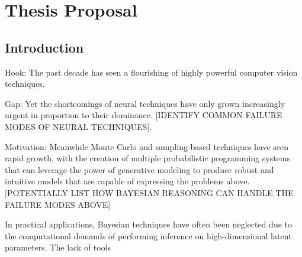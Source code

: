
\chapter{Thesis Proposal}

\section{Introduction}

Hook: The past decade has seen a flourishing of highly powerful computer vision techniques.

Gap: Yet the shortcomings of neural techniques have only grown increasingly urgent
in proportion to their dominance. [IDENTIFY COMMON FAILURE MODES OF NEURAL
TECHNIQUES].

Motivation: Meanwhile Monte Carlo and sampling-based techniques have seen rapid
growth, with the creation of multiple probabilistic programming systems that
can leverage the power of generative modeling to produce robust and intuitive
models that are capable of expressing the problems above.
[POTENTIALLY LIST HOW BAYESIAN REASONING CAN HANDLE THE FAILURE MODES ABOVE]

In practical applications, Bayesian techniques have often been neglected due
to the computational demands of performing inference on high-dimensional latent
parameters. The lack of tools 

